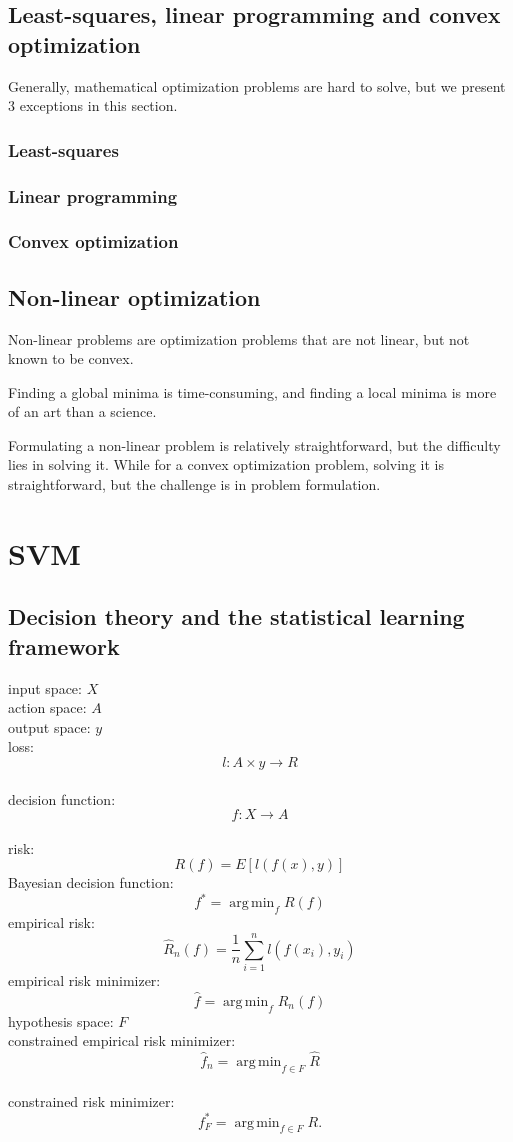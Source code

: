 \documentclass{report}
\DeclareMathOperator*{\argmin}{arg\,min}
\begin{document}
\section{Least-squares, linear programming and convex optimization}
Generally, mathematical optimization problems are hard to solve, but we present 3 exceptions in this section.
\subsection{Least-squares}
\subsection{Linear programming}
\subsection{Convex optimization}
\section{Non-linear optimization}
Non-linear problems are optimization problems that are not linear, but not known to be convex.

Finding a global minima is time-consuming, and finding a local minima is more of an art than a science.

Formulating a non-linear problem is relatively straightforward, but the difficulty lies in solving it. While for a convex optimization problem, solving it is straightforward, but the challenge is in problem formulation. 
\chapter{SVM}
\section{Decision theory and the statistical learning framework}
{\noindent input space: $X$}\\
action space: $A$\\
output space: $y$\\
loss: \[ l: A \times y \to R\]\\
decision function: \[ f: X \to A\] \\
risk: \[R(f) = E[l(f(x), y)] \]
Bayesian decision function: \[ f^{\ast} = \argmin_{f} R(f) \]
empirical risk: \[
\hat{R}_n(f) = \frac{1}{n} \sum_{i=1}^{n} l(f(x_i), y_i)\]
empirical risk minimizer: \[
	\hat{f} = \argmin_{f} \hat{R}_n(f)
\] 
hypothesis space: $F$ \\
constrained empirical risk minimizer: \[
	\hat{f}_{n} = \argmin_{f \in F} \hat{R}
\] \\
constrained risk minimizer: \[
	f^{\ast}_{F} = \argmin_{f \in F} R
.\] 
\end{document}
